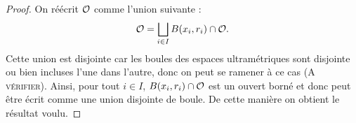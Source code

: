 \documentclass[../../rapport.tex]{subfiles}
\begin{document}
  \begin{proof}
    On réécrit $\mathcal{O}$ comme l'union suivante :
    $$\mathcal{O} = \bigsqcup_{i\in I}{B(x_i, r_i) \cap \mathcal{O}}.$$
    Cette union est disjointe car les boules des espaces ultramétriques sont disjointe ou bien incluses l'une dans l'autre,
    donc on peut se ramener à ce cas (\textsc{A vérifier}). %
    Ainsi, pour tout $i \in I$, $B(x_i, r_i) \cap \mathcal{O}$ est un ouvert borné et donc peut être écrit comme une union disjointe de boule.
    De cette manière on obtient le résultat voulu.
  \end{proof}
\end{document}
